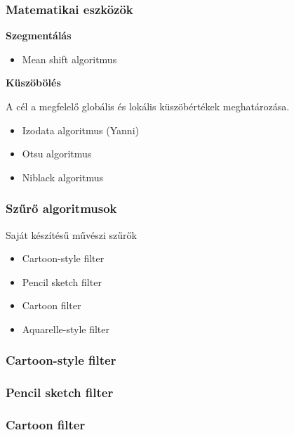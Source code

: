 \documentclass{beamer}
\begin{document}
\begin{frame}[fragile]
\frametitle{Matematikai eszközök}

\textbf{Szegmentálás}

\begin{itemize}
\item Mean shift algoritmus
\end{itemize}

\bigskip

\textbf{Küszöbölés}

A cél a megfelelő globális és lokális küszöbértékek meghatározása.

\begin{itemize}
\item Izodata algoritmus (Yanni)
\item Otsu algoritmus
\item Niblack algoritmus
\end{itemize}

\end{frame}

\begin{frame}[fragile]
\frametitle{Szűrő algoritmusok}

Saját készítésű művészi szűrők

\begin{itemize}
\item Cartoon-style filter
\item Pencil sketch filter
\item Cartoon filter
\item Aquarelle-style filter
\end{itemize}

\end{frame}

\begin{frame}[fragile]
\frametitle{Cartoon-style filter}

\end{frame}

\begin{frame}[fragile]
\frametitle{Pencil sketch filter}

\end{frame}

\begin{frame}[fragile]
\frametitle{Cartoon filter}

\end{frame}
\end{document}
